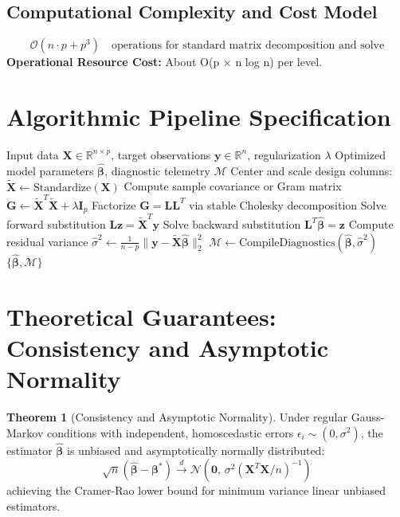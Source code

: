 \documentclass[11pt,a4paper]{article}
\theoremstyle{definition}
\newtheorem{theorem}{\textbf{Theorem}}[section]
\begin{document}
\subsection{Computational Complexity and Cost Model}
\begin{equation}
\mathcal{O}(n \cdot p + p^3) \quad \text{operations for standard matrix decomposition and solve}
\end{equation}
\textbf{Operational Resource Cost:} About O(p × n log n) per level.

\section{Algorithmic Pipeline Specification}

\begin{algorithm}[H]
\caption{CART decision trees Execution}
\begin{algorithmic}[1]
\Require Input data $\mathbf{X} \in \mathbb{R}^{n \times p}$, target observations $\mathbf{y} \in \mathbb{R}^n$, regularization $\lambda$
\Ensure Optimized model parameters $\hat{\boldsymbol{\beta}}$, diagnostic telemetry $\mathcal{M}$
\State Center and scale design columns: $\tilde{\mathbf{X}} \gets \text{Standardize}(\mathbf{X})$
\State Compute sample covariance or Gram matrix $\mathbf{G} \gets \tilde{\mathbf{X}}^T \tilde{\mathbf{X}} + \lambda \mathbf{I}_p$
\State Factorize $\mathbf{G} = \mathbf{L} \mathbf{L}^T$ via stable Cholesky decomposition
\State Solve forward substitution $\mathbf{L} \mathbf{z} = \tilde{\mathbf{X}}^T \mathbf{y}$
\State Solve backward substitution $\mathbf{L}^T \hat{\boldsymbol{\beta}} = \mathbf{z}$
\State Compute residual variance $\hat{\sigma}^2 \gets \frac{1}{n - p} \| \mathbf{y} - \tilde{\mathbf{X}} \hat{\boldsymbol{\beta}} \|_2^2$
\State $\mathcal{M} \gets \text{CompileDiagnostics}(\hat{\boldsymbol{\beta}}, \hat{\sigma}^2)$
\State \Return $\{\hat{\boldsymbol{\beta}}, \mathcal{M}\}$
\end{algorithmic}
\end{algorithm}

\section{Theoretical Guarantees: Consistency and Asymptotic Normality}

\begin{theorem}[Consistency and Asymptotic Normality]
Under regular Gauss-Markov conditions with independent, homoscedastic errors $\epsilon_i \sim (0, \sigma^2)$, the estimator $\hat{\boldsymbol{\beta}}$ is unbiased and asymptotically normally distributed:
\begin{equation}
\sqrt{n}(\hat{\boldsymbol{\beta}} - \boldsymbol{\beta}^*) \xrightarrow{d} \mathcal{N}\left(\mathbf{0}, \, \sigma^2 (\mathbf{X}^T \mathbf{X} / n)^{-1}\right)
\end{equation}
achieving the Cramer-Rao lower bound for minimum variance linear unbiased estimators.
\end{theorem}
\end{document}
